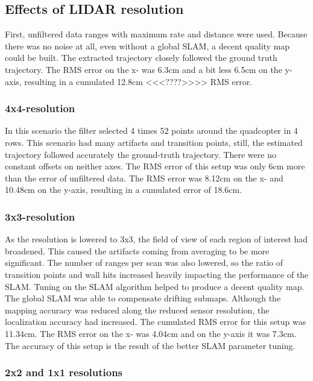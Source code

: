 \documentclass[conference]{IEEEtran}
\begin{document}
\subsection{Effects of LIDAR resolution}

First, unfiltered data ranges with maximum rate and distance were used. Because there was no noise at all, even without a global SLAM, a decent quality map could be built. The extracted trajectory closely followed the ground truth trajectory. The RMS error on the x- was 6.3cm and a bit less 6.5cm on the y-axis, resulting in a cumulated 12.8cm <<<????>>>> RMS error. 

\subsubsection{4x4-resolution}

In this scenario the filter selected 4 times 52 points around the quadcopter in 4 rows. This scenario had many artifacts and transition points, still, the estimated trajectory followed accurately the ground-truth trajectory. There were no constant offsets on neither axes. The RMS error of this setup was only 6cm more than the error of unfiltered data. The RMS error was 8.12cm on the x- and 10.48cm on the y-axis, resulting in a cumulated error of 18.6cm. 

\subsubsection{3x3-resolution}

As the resolution is lowered to 3x3, the field of view of each region of interest had broadened. This caused the artifacts coming from averaging to be more significant. The number of ranges per scan was also lowered, so the ratio of transition points and wall hits increased heavily impacting the performance of the SLAM. Tuning on the SLAM algorithm helped to produce a decent quality map. The global SLAM was able to compensate drifting submaps. Although the mapping accuracy was reduced along the reduced sensor resolution, the localization accuracy had increased. The cumulated RMS error for this setup was 11.34cm. The RMS error on the x- was 4.04cm and on the y-axis it was 7.3cm. The accuracy of this setup is the result of the  better SLAM parameter tuning. 

\subsubsection{2x2 and 1x1 resolutions}
\end{document}
